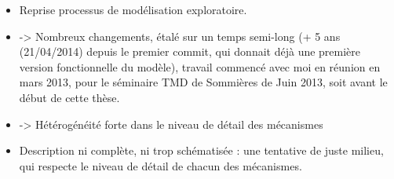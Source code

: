 \begin{itemize}
	\item Reprise processus de modélisation exploratoire.
	\item -> Nombreux changements, étalé sur un temps semi-long (+ 5 ans (21/04/2014) depuis le premier commit, qui donnait déjà une première version fonctionnelle du modèle), travail commencé avec moi en réunion en mars 2013, pour le séminaire TMD de Sommières de Juin 2013, soit avant le début de cette thèse. 
	\item -> Hétérogénéité forte dans le niveau de détail des mécanismes
	\item Description ni complète, ni trop schématisée : une tentative de juste milieu, qui respecte le niveau de détail de chacun des mécanismes.
\end{itemize}





\printbibliography[title={Références}]
